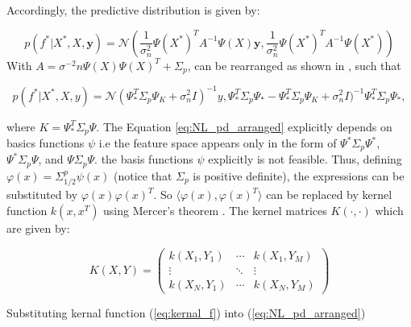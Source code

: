 Accordingly, the predictive distribution is given by:

\begin{equation}\label{eq:Nl_pd}
p(f^*|X^*,X,\mathbf{y}) = \mathcal{N} \left( \frac{1}{\sigma_n^2} \Psi(X^*)^T A^{-1} \Psi(X) \mathbf{y}, \frac{1}{\sigma_n^2} \Psi(X^*)^T A^{-1} \Psi(X^*) \right)
\end{equation}
With $A = \sigma^{-2} n \Psi(X)\Psi(X)^T + \Sigma_p$, can be rearranged as shown in \cite{williams2006gaussian}, such that

\begin{equation}\label{eq:NL_pd_arranged}
p(f^*|X^*, X, y) = \mathcal{N}(\Psi_*^T \Sigma_p \Psi_K + \sigma^2_n I)^{-1} y, \Psi_*^T \Sigma_p \Psi_* - \Psi_*^T \Sigma_p \Psi_K + \sigma^2_n I)^{-1} \Psi_*^T \Sigma_p \Psi_*,
\end{equation}

where $K = \Psi_*^T \Sigma_p \Psi$. The Equation \ref{eq:NL_pd_arranged} explicitly depends on basics functions $\psi$ i.e the feature space appears only in the form of $\Psi^*\Sigma_p\Psi^*$, $\Psi^*\Sigma_p\Psi$, and $\Psi\Sigma_p\Psi$. the basis functions $\psi$ explicitly is not feasible. Thus, defining $\varphi(x) = \Sigma_{1/2}^p \psi(x)$ (notice that $\Sigma_p$ is positive definite), the expressions can be substituted by $\varphi(x) \varphi(x)^T$. So $\langle \varphi(x), \varphi(x)^T \rangle$ can be replaced by kernel function $k(x,x^T)$ using Mercer’s theorem \cite{kanagawa2018}. The kernel matrices $K(\cdot,\cdot)$ which are given by:

\begin{equation}\label{eq:kernal_f}
    K(X,Y) =
\begin{pmatrix}
k(X_1,Y_1) & \cdots & k(X_1,Y_M) \\
\vdots & \ddots & \vdots \\
k(X_N,Y_1) & \cdots & k(X_N,Y_M)
\end{pmatrix}
\end{equation}

Substituting kernal function (\ref{eq:kernal_f}) into (\ref{eq:NL_pd_arranged})


